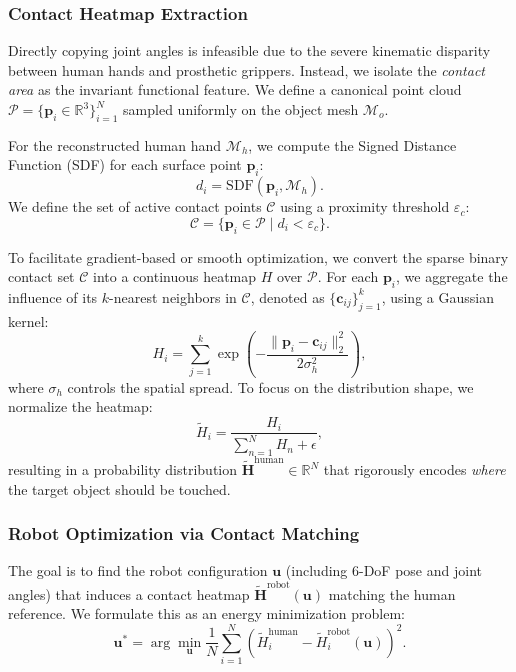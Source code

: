 \documentclass[letterpaper, 10 pt, conference]{ieeeconf}  %
\begin{document}
\subsubsection{Contact Heatmap Extraction}
Directly copying joint angles is infeasible due to the severe kinematic disparity between human hands and prosthetic grippers. Instead, we isolate the \textit{contact area} as the invariant functional feature. We define a canonical point cloud $\mathcal{P}=\{ \mathbf{p}_i \in \mathbb{R}^3\}_{i=1}^{N}$ sampled uniformly on the object mesh $\mathcal{M}_o$.

For the reconstructed human hand $\mathcal{M}_h$, we compute the Signed Distance Function (SDF) for each surface point $\mathbf{p}_i$:
\begin{equation}
d_i = \mathrm{SDF}(\mathbf{p}_i, \mathcal{M}_h).
\end{equation}
We define the set of active contact points $\mathcal{C}$ using a proximity threshold $\varepsilon_c$:
\begin{equation}
\mathcal{C}=\{\mathbf{p}_i \in \mathcal{P} \mid d_i < \varepsilon_c\}.
\label{eq:contact_mask}
\end{equation}

To facilitate gradient-based or smooth optimization, we convert the sparse binary contact set $\mathcal{C}$ into a continuous heatmap $H$ over $\mathcal{P}$. For each $\mathbf{p}_i$, we aggregate the influence of its $k$-nearest neighbors in $\mathcal{C}$, denoted as $\{\mathbf{c}_{ij}\}_{j=1}^{k}$, using a Gaussian kernel:
\begin{equation}
H_i = \sum_{j=1}^{k}\exp\!\left(-\frac{\|\mathbf{p}_i-\mathbf{c}_{ij}\|_2^2}{2\sigma_h^2}\right),
\label{eq:heatmap_knn}
\end{equation}
where $\sigma_h$ controls the spatial spread. To focus on the distribution shape, we normalize the heatmap:
\begin{equation}
\tilde{H}_i = \frac{H_i}{\sum_{n=1}^{N} H_n + \epsilon},
\label{eq:heatmap_norm}
\end{equation}
resulting in a probability distribution $\tilde{\mathbf{H}}^{\text{human}} \in \mathbb{R}^N$ that rigorously encodes \textit{where} the target object should be touched.

\subsubsection{Robot Optimization via Contact Matching}
The goal is to find the robot configuration $\mathbf{u}$ (including 6-DoF pose and joint angles) that induces a contact heatmap $\tilde{\mathbf{H}}^{\text{robot}}(\mathbf{u})$ matching the human reference. We formulate this as an energy minimization problem:
\begin{equation}
\mathbf{u}^* = \arg\min_{\mathbf{u}} \frac{1}{N}\sum_{i=1}^{N}\left(\tilde{H}^{\text{human}}_i-\tilde{H}^{\text{robot}}_i(\mathbf{u})\right)^2.
\label{eq:loss_heat}
\end{equation}
\end{document}
